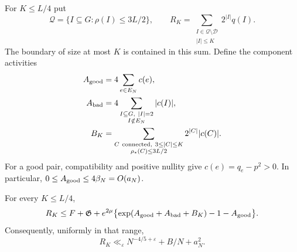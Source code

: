 For $K\le L/4$ put
\[
 \mathscr Q=\{I\subseteq G:\rho(I)\le3L/2\},
 \qquad
 R_K=\sum_{\substack{I\in\mathscr Q\setminus\mathscr D\\|I|\le K}}
          2^{|I|}q(I).
\]
The boundary of size at most $K$ is contained in this sum.
Define the component activities
\begin{align}
 A_{\rm good}&=4\sum_{e\in E_N}c(e),\notag\\
 A_{\rm bad}&=4\sum_{\substack{I\subseteq G,\ |I|=2\\I\notin E_N}}
                                      |c(I)|,\notag\\
 B_K&=\sum_{\substack{C\ {\rm connected},\ 3\le|C|\le K\\
                                  \rho_*(C)\le3L/2}}
                              2^{|C|}|c(C)|.
 \label{p1:close:activities}
\end{align}
For a good pair, compatibility and positive nullity give
$c(e)=q_e-p^2>0$.  In particular,
$0\le A_{\rm good}\le4\beta_N=O(a_N)$.

\begin{proposition}
\label{p1:close:boundary-mass}
For every $K\le L/4$,
\begin{equation}
 R_K\le F+\mathfrak G+
 e^{2\mu}\bigl\{
          \exp(A_{\rm good}+A_{\rm bad}+B_K)-1-A_{\rm good}
          \bigr\}.
 \label{p1:close:boundary-inequality}
\end{equation}
Consequently, uniformly in that range,
\begin{equation}
 R_K\ll_\varepsilon
        N^{-4/5+\varepsilon}+B/N+a_N^2.
 \label{p1:close:boundary-rate}
\end{equation}
\end{proposition}

